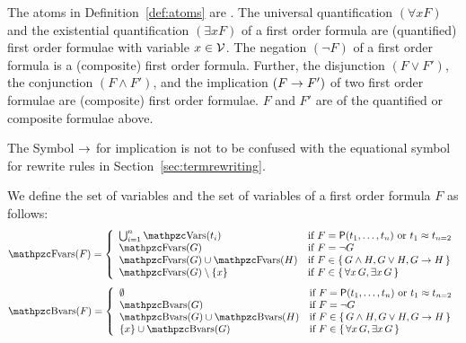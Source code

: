 
\begin{definition}[\FOF]\label{def:syntax:FOF}
	The atoms in Definition~\vref{def:atoms} are .
	The universal quantification \( (\forall x F) \)
	and the existential quantification \( (\exists x F) \)
	of a first order formula are (quantified) first order formulae
	with  variable \( x\in\mathcal{V} \).
	The negation \( (\lnot F) \) of a first order formula
	is a (composite) first order formula.
	Further, the disjunction \( (F \lor F') \),
	the conjunction \( (F \land F')  \),
	and the implication \( (F \rightarrow F') \)
	of two first order formulae
	are (composite) first order formulae.
%
	\(F \) and \( F' \) are  of
	the quantified or composite formulae above.
\end{definition}

\begin{remark}
	The Symbol \( \rightarrow \) for implication is not to be confused
	with the equational symbol for rewrite rules in Section~\ref{sec:termrewriting}.
\end{remark}

\begin{definition}\label{def:fof:fvars}\label{def:fof:bvars}
	We define the set of  variables and the set of  variables
	of a first order formula \( F \) as follows:
\begin{gather*}
	\MDEFINE{\fvar(F)}{ll}{
		\bigcup_{i=1}^n \var(t_i) &\text{if }F
		= \mP(t_1,\ldots,t_n)\text{ or }t_1\mEQ{} t_{n=2}
		\\
		\fvar(G)&\text{if }F = \lnot G
		\\
		\fvar(G) \cup \fvar(H)&\text{if }F \in \{ \, G\land H,G \lor H,G\limp H \, \}
		\\
		\fvar (G) \setminus \{ x\} &\text{if } F \in \{ \, \forall x \, G, \exists x \, G \, \}
	}
\end{gather*}
\begin{gather*}
\MDEFINE{\bvar(F)}{ll}{
	\emptyset &\text{if }F = \mP(t_1,\ldots,t_n)\text{ or }t_1\mEQ t_{n=2}
	\\
	\bvar(G)&\text{if }F = \lnot G
	\\
	\bvar(G) \cup \bvar(H)&\text{if }F \in \{ \, G \land H, G \lor H, G \limp H \, \}
	\\
	\{ x\} \cup \bvar (G) &\text{if } F \in \{ \, \forall x \, G, \exists x\,G \, \}
}
\end{gather*}
\end{definition}

